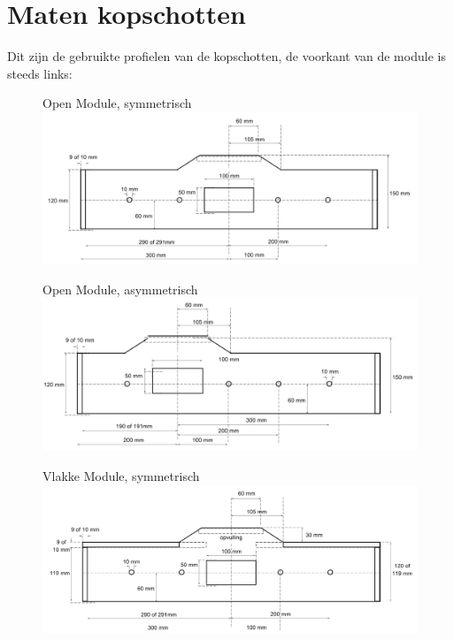 \documentclass[12pt,a4paper]{report}
\begin{document}
\section{Maten kopschotten}

Dit zijn de gebruikte profielen van de kopschotten, de voorkant van de module is steeds links:

\begin{figure}[ht]
  \captionbox
  {Open Module, symmetrisch}
  {\includegraphics[scale=0.25]{images/rcu_open_sym}}
\end{figure}

\begin{figure}[ht]
  \captionbox
  {Open Module, asymmetrisch}
  {\includegraphics[scale=0.25]{images/rcu_open_asym}}
\end{figure}

\begin{figure}[ht]
  \captionbox
  {Vlakke Module, symmetrisch}
  {\includegraphics[scale=0.25]{images/rcu_vlak_sym}}
\end{figure}
\end{document}

